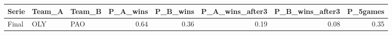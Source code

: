 \begin{table}[ht]
\centering
\begin{tabular}{lllrrrrr}
  \hline
Serie & Team\_A & Team\_B & P\_A\_wins & P\_B\_wins & P\_A\_wins\_after3 & P\_B\_wins\_after3 & P\_5games \\ 
  \hline
Final & OLY & PAO & 0.64 & 0.36 & 0.19 & 0.08 & 0.35 \\ 
   \hline
\end{tabular}
\end{table}
